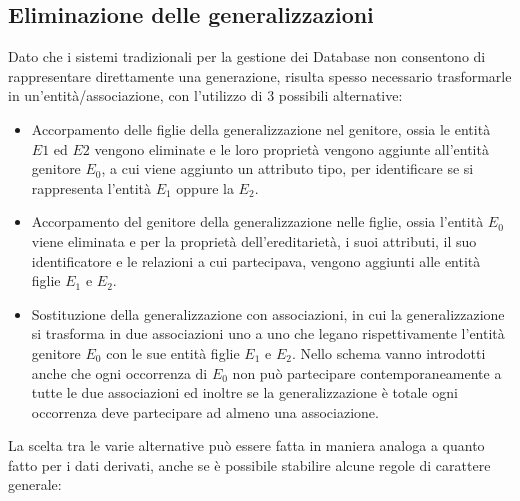 \subsection{Eliminazione delle generalizzazioni}
Dato che i sistemi tradizionali per la gestione dei Database non consentono di rappresentare direttamente una generazione,
risulta spesso necessario trasformarle in un'entità/associazione, con l'utilizzo di 3 possibili alternative:
\begin{itemize}
    \item Accorpamento delle figlie della generalizzazione nel genitore, ossia le entità $E1$ ed $E2$ vengono eliminate
          e le loro proprietà vengono aggiunte all'entità genitore $E_0$, a cui viene aggiunto un attributo tipo, per 
          identificare se si rappresenta l'entità $E_1$ oppure la $E_2$.
    \item Accorpamento del genitore della generalizzazione nelle figlie, ossia l'entità $E_0$ viene eliminata e per la
          proprietà dell'ereditarietà, i suoi attributi, il suo identificatore e le relazioni a cui partecipava, vengono
          aggiunti alle entità figlie $E_1$ e $E_2$.
    \item Sostituzione della generalizzazione con associazioni, in cui la generalizzazione si trasforma in due associazioni
          uno a uno che legano rispettivamente l'entità genitore $E_0$ con le sue entità figlie $E_1$ e $E_2$.\newline
          Nello schema vanno introdotti anche che ogni occorrenza di $E_0$ non può partecipare contemporaneamente a tutte 
          le due associazioni ed inoltre se la generalizzazione è totale ogni occorrenza deve partecipare ad almeno una 
          associazione.
\end{itemize}
La scelta tra le varie alternative può essere fatta in maniera analoga a quanto fatto per i dati derivati, anche se 
è possibile stabilire alcune regole di carattere generale:
